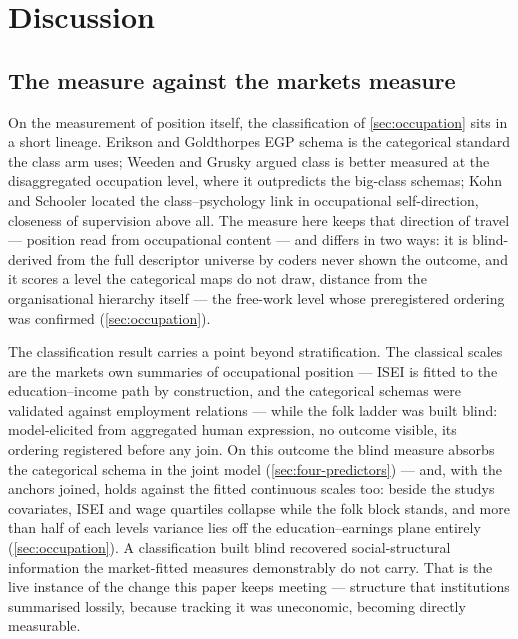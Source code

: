 \section{Discussion}\label{sec:a-discussion}

\subsection{The measure against the market\textquotesingle s measure}\label{sec:market-measure}

On the measurement of position itself, the classification of \cref{sec:occupation} sits in
a short lineage. Erikson and Goldthorpe\textquotesingle s EGP schema is the categorical
standard the class arm uses; Weeden and Grusky\cite{weeden2005} argued class is better
measured at the disaggregated occupation level, where it outpredicts the
big-class schemas; Kohn and Schooler located the class--psychology link in
occupational self-direction, closeness of supervision above all. The
measure here keeps that direction of travel --- position read from
occupational content --- and differs in two ways: it is blind-derived from
the full descriptor universe by coders never shown the outcome, and it
scores a level the categorical maps do not draw, distance from the
organisational hierarchy itself --- the free-work level whose preregistered
ordering was confirmed (\cref{sec:occupation}).

The classification result carries a point beyond stratification. The
classical scales are the market\textquotesingle s own summaries of occupational position ---
ISEI is fitted to the education--income path by construction, and the
categorical schemas were validated against employment relations --- while
the folk ladder was built blind: model-elicited from aggregated human
expression, no outcome visible, its ordering registered before any join.
On this outcome the blind measure absorbs the categorical schema in the
joint model (\cref{sec:four-predictors}) --- and, with the anchors joined, holds against the
fitted continuous scales too: beside the study\textquotesingle s covariates, ISEI and wage
quartiles collapse while the folk block stands, and more than half of each
level\textquotesingle s variance lies off the education--earnings plane entirely (\cref{sec:occupation}).
A classification built blind recovered social-structural information the
market-fitted measures demonstrably do not carry. That
is the live instance of the change this paper keeps meeting --- structure
that institutions summarised lossily, because tracking it was uneconomic,
becoming directly measurable.


